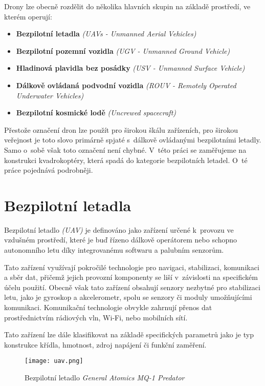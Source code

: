 \documentclass[12pt]{report}
\begin{document}
Drony lze obecně rozdělit do několika hlavních skupin na základě prostředí, ve kterém operují:
\begin{itemize}
	\item \textbf{Bezpilotní letadla} \textit{(UAVs - Unmanned Aerial Vehicles)}
	\item \textbf{Bezpilotní pozemní vozidla} \textit{(UGV - Unmanned Ground Vehicle)}
	\item \textbf{Hladinová plavidla bez posádky} \textit{(USV - Unmanned Surface Vehicle)}
	\item \textbf{Dálkově ovládaná podvodní vozidla} \textit{(ROUV - Remotely Operated Underwater Vehicles)}
	\item \textbf{Bezpilotní kosmické lodě} \textit{(Uncrewed spacecraft)}
\end{itemize}

Přestože označení dron lze použít pro širokou škálu zařízeních, pro širokou veřejnost je toto slovo primárně spjaté s~dálkově ovládanými bezpilotními letadly. Samo o~sobě však toto označení není chybné. V~této práci se zaměřujeme na konstrukci kvadrokoptéry, která spadá do kategorie bezpilotních letadel. O~té práce pojednává podrobněji. \cite{mainbook}

\section[Bezpilotní letadla]{Bezpilotní letadla}
Bezpilotní letadlo \textit{(UAV)} je definováno jako zařízení určené k~provozu ve vzdušném prostředí, které je buď řízeno dálkově operátorem nebo schopno autonomního letu díky integrovanému softwaru a palubním senzorům.

Tato zařízení využívají pokročilé technologie pro navigaci, stabilizaci, komunikaci a sběr dat, přičemž jejich provozní komponenty se liší v~závislosti na specifickém účelu použití. Obecně však tato zařízení obsahují senzory nezbytné pro stabilizaci letu, jako je gyroskop a akcelerometr, spolu se senzory či moduly umožňujícími komunikaci. Komunikační technologie obvykle zahrnují přenos dat prostřednictvím rádiových vln, Wi-Fi, nebo mobilních sítí.

Tato zařízení lze dále klasifikovat na základě specifických parametrů jako je typ konstrukce křídla, hmotnost, zdroj napájení či funkční zaměření.

\begin{figure}[H]
	\centering
	\texttt{[image: uav.png]}
	\caption{Bezpilotní letadlo \textit{General Atomics MQ-1 Predator} \cite{mainbook}}
	\label{fig:uav.png}
  \end{figure}
\end{document}
